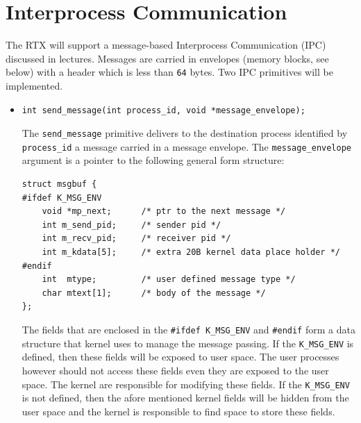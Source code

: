 \section{Interprocess Communication}
\label{sec_ipc}
The RTX will support a message-based Interprocess Communication (IPC) discussed in lectures. Messages are carried in envelopes (memory blocks, see below) with a header which is less than \verb+64+ bytes. Two IPC primitives will be implemented. \\ 
  \begin{itemize}
    \item[]{}
\begin{lstlisting}
int send_message(int process_id, void *message_envelope);
\end{lstlisting}
The \verb+send_message+ primitive delivers to the destination process identified by \verb+process_id+ a message carried in a message envelope.
      The \verb+message_envelope+ argument is a pointer to the following general form structure:
\begin{lstlisting}
struct msgbuf {
#ifdef K_MSG_ENV
    void *mp_next;      /* ptr to the next message */
    int m_send_pid;     /* sender pid */
    int m_recv_pid;     /* receiver pid */
    int m_kdata[5];     /* extra 20B kernel data place holder */
#endif
    int  mtype;         /* user defined message type */
    char mtext[1];      /* body of the message */
};
\end{lstlisting}
      The fields that are enclosed in the \verb+#ifdef K_MSG_ENV+ and \verb+#endif+ form a data structure that kernel uses to manage the message passing. If the \verb+K_MSG_ENV+ is defined, then these fields will be exposed to user space. The user processes however should not access these fields even they are exposed to the user space. The kernel are responsible for modifying these fields. If the \verb+K_MSG_ENV+ is not defined, then the afore mentioned kernel fields will be hidden from the user space and the kernel is responsible to find space to store these fields.


\end{itemize}
